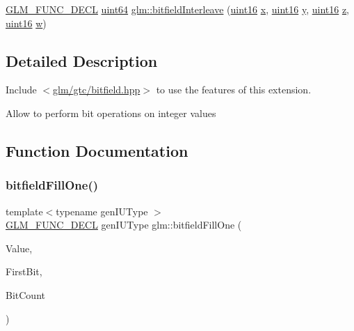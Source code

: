 \begin{DoxyCompactItemize}
\item 
\mbox{\hyperlink{setup_8hpp_ab2d052de21a70539923e9bcbf6e83a51}{G\+L\+M\+\_\+\+F\+U\+N\+C\+\_\+\+D\+E\+CL}} \mbox{\hyperlink{group__gtc__type__precision_gae3632bf9b37da66233d78930dd06378a}{uint64}} \mbox{\hyperlink{group__gtc__bitfield_gac8a926a7bfd9b23c22a4f685193fbfe1}{glm\+::bitfield\+Interleave}} (\mbox{\hyperlink{group__gtc__type__precision_gad8c2939e1fdd8e5828b31d95c52255d5}{uint16}} \mbox{\hyperlink{_s_d_l__opengl_8h_ad0e63d0edcdbd3d79554076bf309fd47}{x}}, \mbox{\hyperlink{group__gtc__type__precision_gad8c2939e1fdd8e5828b31d95c52255d5}{uint16}} \mbox{\hyperlink{_s_d_l__opengl_8h_a1675d9d7bb68e1657ff028643b4037e3}{y}}, \mbox{\hyperlink{group__gtc__type__precision_gad8c2939e1fdd8e5828b31d95c52255d5}{uint16}} \mbox{\hyperlink{_s_d_l__opengl__glext_8h_a5e74030ebb3297ce1b37ff716fedd68f}{z}}, \mbox{\hyperlink{group__gtc__type__precision_gad8c2939e1fdd8e5828b31d95c52255d5}{uint16}} \mbox{\hyperlink{_s_d_l__opengl__glext_8h_a6ee8f168a7ab6785a9bb57c6715dad99}{w}})
\end{DoxyCompactItemize}


\subsection{Detailed Description}
Include $<$\mbox{\hyperlink{bitfield_8hpp}{glm/gtc/bitfield.\+hpp}}$>$ to use the features of this extension.

Allow to perform bit operations on integer values 

\subsection{Function Documentation}
\mbox{\label{group__gtc__bitfield_ga46f9295abe3b5c7658f5b13c7f819f0a}} 
\subsubsection{\texorpdfstring{bitfield\+Fill\+One()}{bitfieldFillOne()}\hspace{0.1cm}{\footnotesize\ttfamily [1/2]}}
{\footnotesize\ttfamily template$<$typename gen\+I\+U\+Type $>$ \\
\mbox{\hyperlink{setup_8hpp_ab2d052de21a70539923e9bcbf6e83a51}{G\+L\+M\+\_\+\+F\+U\+N\+C\+\_\+\+D\+E\+CL}} gen\+I\+U\+Type glm\+::bitfield\+Fill\+One (\begin{DoxyParamCaption}\item[{gen\+I\+U\+Type}]{Value,  }\item[{int}]{First\+Bit,  }\item[{int}]{Bit\+Count }\end{DoxyParamCaption})}

